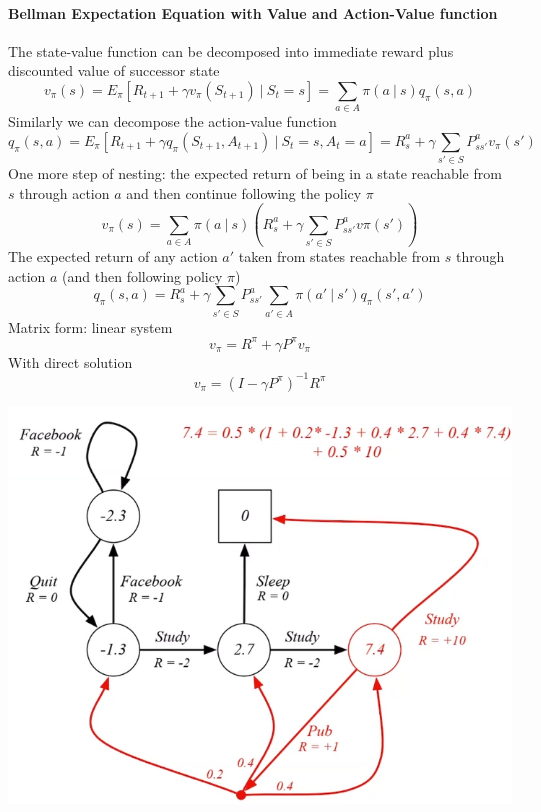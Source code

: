 \documentclass[10pt]{report}
\begin{document}
\paragraph{Bellman Expectation Equation with Value and Action-Value function}
The state-value function can be decomposed into immediate reward plus discounted value of successor state
$$v_\pi(s) = E_\pi[R_{t+1} + \gamma v_\pi(S_{t+1})\:|\:S_t=s] = \sum_{a\in A }\pi(a\:|\:s)q_\pi(s,a)$$
Similarly we can decompose the action-value function
$$q_\pi(s,a) = E_\pi[R_{t+1}+\gamma q_\pi(S_{t+1}, A_{t+1})\:|\:S_t=s, A_t=a] = R_s^a + \gamma\sum_{s'\in S} P_{ss'}^av_\pi(s')$$
One more step of nesting: the expected return of being in a state reachable from $s$ through action $a$ and then continue following the policy $\pi$
$$v_\pi(s) = \sum_{a\in A} \pi(a\:|\:s) \left(R_s^a + \gamma\sum_{s'\in S} P_{ss'}^a v\pi(s')\right)$$
The expected return of any action $a'$ taken from states reachable from $s$ through action $a$ (and then following policy $\pi$)
$$q_\pi(s,a) = R_s^a + \gamma\sum_{s'\in S}P_{ss'}^a \sum_{a'\in A}\pi(a'\:|\:s')q_\pi(s',a')$$
Matrix form: linear system
$$v_\pi = R^\pi + \gamma P^\pi v_\pi$$
With direct solution
$$v_\pi = (I-\gamma P^\pi)^{-1}R^\pi$$
\begin{center}
	\includegraphics[scale=0.5]{162.png}
\end{center}
\end{document}
